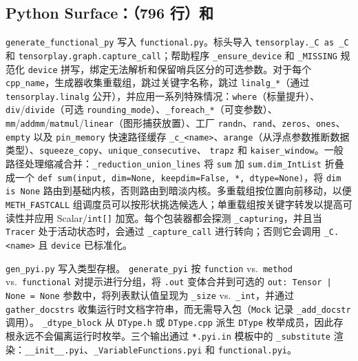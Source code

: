 \subsection{Python Surface：（796 行）和}

\texttt{generate\_functional\_py} 写入 \texttt{functional.py}。标头导入 \texttt{tensorplay.\_C as \_C} 和 \texttt{tensorplay.graph.capture\_call}；帮助程序 \texttt{\_ensure\_device} 和 \texttt{\_MISSING} 规范化 \texttt{device} 拼写，绑定无法解析和保留哨兵区分的可选参数。对于每个 \texttt{cpp\_name}，生成器收集重载组，跳过关键字名称，跳过 \texttt{linalg\_*}（通过 \texttt{tensorplay.linalg} 公开），并应用一系列特殊情况：\texttt{where}（标量提升）、\texttt{div}/\texttt{divide}（可选 \texttt{rounding\_mode}）、\texttt{\_foreach\_*}（可变参数）、 \texttt{mm}/\texttt{addmm}/\texttt{matmul}/\texttt{linear}（图形捕获放置）、工厂 \texttt{randn}、\texttt{rand}、\texttt{zeros}、\texttt{ones}、\texttt{empty} 以及 \texttt{pin\_memory} 快速路径缓存 \texttt{\_c\_<name>}、\texttt{arange}（从浮点参数推断数据类型）、\texttt{squeeze\_copy}、\texttt{unique\_consecutive}、 \texttt{trapz} 和 \texttt{kaiser\_window}。一般路径处理缩减合并：\texttt{\_reduction\_union\_lines} 将 \texttt{sum} 加 \texttt{sum.dim\_IntList} 折叠成一个 \texttt{def sum(input, dim=None, keepdim=False, *, dtype=None)}，将 \texttt{dim is None} 路由到基础内核，否则路由到暗淡内核。多重载组按位置向前移动，以便 \texttt{METH\_FASTCALL} 组调度员可以按形状挑选候选人；单重载组按关键字转发以提高可读性并应用 Scalar/\texttt{int[]} 加宽。每个包装器都会探测 \texttt{\_capturing}，并且当 \texttt{Tracer} 处于活动状态时，会通过 \texttt{\_capture\_call} 进行转向；否则它会调用 \texttt{\_C.<name>} 且 \texttt{device} 已标准化。

\texttt{gen\_pyi.py} 写入类型存根。 \texttt{generate\_pyi} 按 \texttt{function} vs.\ \texttt{method} vs.\ \texttt{functional} 对提示进行分组，将 \texttt{.out} 变体合并到可选的 \texttt{out: Tensor | None = None} 参数中，将列表默认值呈现为 \texttt{\_size} vs.\ \texttt{\_int}，并通过 \texttt{gather\_docstrs} 收集运行时文档字符串，而无需导入包（\texttt{Mock} 记录 \texttt{\_add\_docstr} 调用）。 \texttt{\_dtype\_block} 从 \texttt{DType.h} 或 \texttt{DType.cpp} 派生 \texttt{DType} 枚举成员，因此存根永远不会偏离运行时枚举。三个输出通过 \texttt{*.pyi.in} 模板中的 \texttt{\_substitute} 渲染：\texttt{\_\_init\_\_.pyi}、\texttt{\_VariableFunctions.pyi} 和 \texttt{functional.pyi}。

